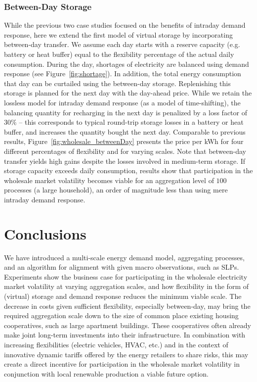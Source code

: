 \documentclass[conference]{IEEEtran}
\begin{document}
\subsubsection{Between-Day Storage}
While the previous two case studies focused on the benefits of intraday demand response, here we extend the first model of virtual storage by incorporating between-day transfer. We assume each day starts with a reserve capacity (e.g. battery or heat buffer) equal to the flexibility percentage of the actual daily consumption. During the day, shortages of electricity are balanced using demand response (see Figure~\ref{fig:shortage}). In addition, the total energy consumption that day can be curtailed using the between-day storage. Replenishing this storage is planned for the next day with the day-ahead price. While we retain the lossless model for intraday demand response (as a model of time-shifting), the balancing quantity for recharging in the next day is penalized by a loss factor of $30\%$ -- this corresponds to typical round-trip storage losses in a battery or heat buffer, and increases the quantity bought the next day. Comparable to previous results, Figure~\ref{fig:wholesale_betweenDay} presents the price per kWh for four different percentages of flexibility and for varying scales. Note that between-day transfer yields high gains despite the losses involved in medium-term storage. If storage capacity exceeds daily consumption, results show that participation in the wholesale market volatility becomes viable for an aggregation level of $100$ processes (a large household), an order of magnitude less than using mere intraday demand response.


\section{Conclusions}
\label{sec:Conclusion}

We have introduced a multi-scale energy demand model, aggregating processes, and an algorithm for alignment with given macro observations, such as SLPs. Experiments show the business case for participating in the wholesale electricity market volatility at varying aggregation scales, and how flexibility in the form of (virtual) storage and demand response reduces the minimum viable scale. The decrease in costs given sufficient flexibility, especially between-day, may bring the required aggregation scale down to the size of common place existing housing cooperatives, such as large apartment buildings. These cooperatives often already make joint long-term investments into their infrastructure. In combination with increasing flexibilities (electric vehicles, HVAC, etc.) and in the context of innovative dynamic tariffs offered by the energy retailers to share risks, this may create a direct incentive for participation in the wholesale market volatility in conjunction with local renewable production a viable future option.
\end{document}
